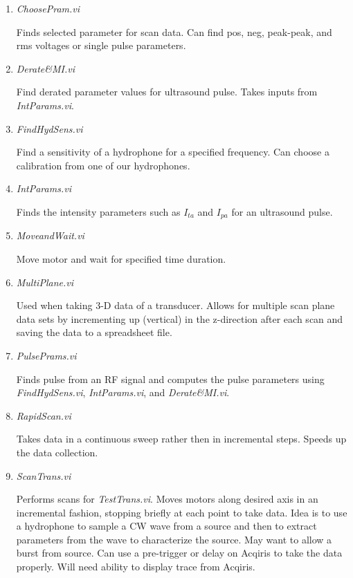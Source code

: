 \documentclass[10pt]{article}
\begin{document}
\begin{enumerate}
\item {\it ChoosePram.vi}

Finds selected parameter for scan data. Can find pos, neg,
peak-peak, and rms voltages or single pulse parameters.

\item {\it Derate\&MI.vi}

Find derated parameter values for ultrasound pulse. Takes inputs
from {\it IntParams.vi}.

\item {\it FindHydSens.vi}

Find a sensitivity of a hydrophone for a specified frequency. Can
choose a calibration from one of our hydrophones.


\item {\it IntParams.vi}

Finds the intensity parameters such as $I_{ta}$ and $I_{pa}$ for
an ultrasound pulse.

\item {\it MoveandWait.vi}

Move motor and wait for specified time duration.

\item {\it MultiPlane.vi}

Used when taking 3-D data of a transducer. Allows for multiple
scan plane data sets by incrementing up (vertical) in the
z-direction after each scan and saving the data to a spreadsheet
file.

\item {\it PulsePrams.vi}

Finds pulse from an RF signal and computes the pulse parameters
using {\it FindHydSens.vi}, {\it IntParams.vi}, and {\it
Derate\&MI.vi}.

\item {\it RapidScan.vi}

Takes data in a continuous sweep rather then in incremental steps.
Speeds up the data collection.

\item  {\it ScanTrans.vi}

Performs scans for {\it TestTrans.vi}. Moves motors along desired
axis in an incremental fashion, stopping briefly at each point to
take data. Idea is to use a hydrophone to sample a CW wave from a
source and then to extract parameters from the wave to
characterize the source. May want to allow a burst from source.
Can use a pre-trigger or delay on Acqiris to take the data
properly. Will need ability to display trace from Acqiris.

\end{enumerate}
\end{document}
